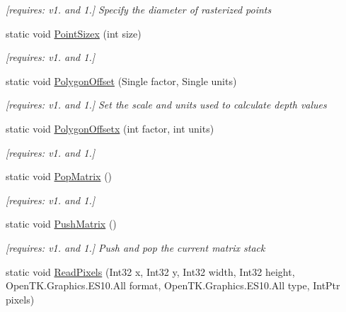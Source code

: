 \begin{DoxyCompactItemize}
\begin{DoxyCompactList}\small\item\em \mbox{[}requires\-: v1. and 1.\mbox{]} Specify the diameter of rasterized points \end{DoxyCompactList}\item 
static void \hyperlink{class_open_t_k_1_1_graphics_1_1_e_s10_1_1_g_l_a47bf15f1e18d14120a4672a81415a587}{Point\-Sizex} (int size)
\begin{DoxyCompactList}\small\item\em \mbox{[}requires\-: v1. and 1.\mbox{]}\end{DoxyCompactList}\item 
static void \hyperlink{class_open_t_k_1_1_graphics_1_1_e_s10_1_1_g_l_a03a9da237b122ce181f3382b092a8604}{Polygon\-Offset} (Single factor, Single units)
\begin{DoxyCompactList}\small\item\em \mbox{[}requires\-: v1. and 1.\mbox{]} Set the scale and units used to calculate depth values \end{DoxyCompactList}\item 
static void \hyperlink{class_open_t_k_1_1_graphics_1_1_e_s10_1_1_g_l_a0b6fc83b6961d6a420945f147aeb6fa3}{Polygon\-Offsetx} (int factor, int units)
\begin{DoxyCompactList}\small\item\em \mbox{[}requires\-: v1. and 1.\mbox{]}\end{DoxyCompactList}\item 
static void \hyperlink{class_open_t_k_1_1_graphics_1_1_e_s10_1_1_g_l_a47b7c5e84b702299f631fbf363022823}{Pop\-Matrix} ()
\begin{DoxyCompactList}\small\item\em \mbox{[}requires\-: v1. and 1.\mbox{]}\end{DoxyCompactList}\item 
static void \hyperlink{class_open_t_k_1_1_graphics_1_1_e_s10_1_1_g_l_a74bdea77dcaf2841137669372a45a5fc}{Push\-Matrix} ()
\begin{DoxyCompactList}\small\item\em \mbox{[}requires\-: v1. and 1.\mbox{]} Push and pop the current matrix stack \end{DoxyCompactList}\item 
static void \hyperlink{class_open_t_k_1_1_graphics_1_1_e_s10_1_1_g_l_a5072fafff4757be4ebbed1894a250303}{Read\-Pixels} (Int32 x, Int32 y, Int32 width, Int32 height, Open\-T\-K.\-Graphics.\-E\-S10.\-All format, Open\-T\-K.\-Graphics.\-E\-S10.\-All type, Int\-Ptr pixels)

\end{DoxyCompactItemize}
